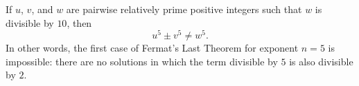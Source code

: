 If $u$, $v$, and $w$ are pairwise relatively prime positive integers such that $w$ is divisible by $10$, then
$$u^5 \pm v^5 \neq w^5.$$
In other words, the first case of Fermat's Last Theorem for exponent $n = 5$ is impossible: there are no solutions in which the term divisible by $5$ is also divisible by $2$.
